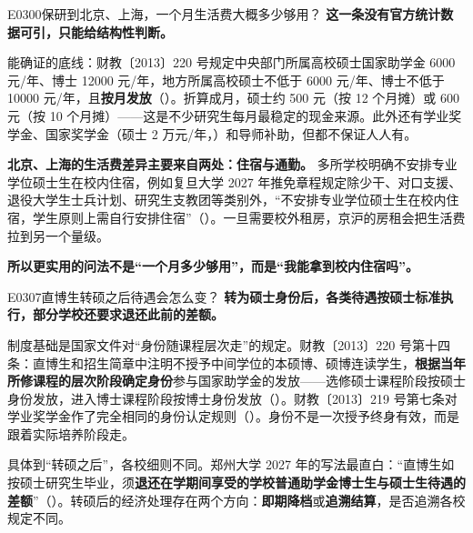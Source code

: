 \begin{qa}{E0300}{保研到北京、上海，一个月生活费大概多少够用？}
\textbf{这一条没有官方统计数据可引，只能给结构性判断。}

能确证的底线：财教〔2013〕220 号规定中央部门所属高校硕士国家助学金 6000 元/年、博士 12000 元/年，地方所属高校硕士不低于 6000 元/年、博士不低于 10000 元/年，且\textbf{按月发放}（）。折算成月，硕士约 500 元（按 12 个月摊）或 600 元（按 10 个月摊）——这是不少研究生每月最稳定的现金来源。此外还有学业奖学金、国家奖学金（硕士 2 万元/年，）和导师补助，但都不保证人人有。

\textbf{北京、上海的生活费差异主要来自两处：住宿与通勤。} 多所学校明确不安排专业学位硕士生在校内住宿，例如复旦大学 2027 年推免章程规定除少干、对口支援、退役大学生士兵计划、研究生支教团等类别外，“不安排专业学位硕士生在校内住宿，学生原则上需自行安排住宿”（）。一旦需要校外租房，京沪的房租会把生活费拉到另一个量级。

\textbf{所以更实用的问法不是“一个月多少够用”，而是“我能拿到校内住宿吗”。}
\end{qa}

\begin{qa}{E0307}{直博生转硕之后待遇会怎么变？}
\textbf{转为硕士身份后，各类待遇按硕士标准执行，部分学校还要求退还此前的差额。}

制度基础是国家文件对“身份随课程层次走”的规定。财教〔2013〕220 号第十四条：直博生和招生简章中注明不授予中间学位的本硕博、硕博连读学生，\textbf{根据当年所修课程的层次阶段确定身份}参与国家助学金的发放——选修硕士课程阶段按硕士身份发放，进入博士课程阶段按博士身份发放（）。财教〔2013〕219 号第七条对学业奖学金作了完全相同的身份认定规则（）。身份不是一次授予终身有效，而是跟着实际培养阶段走。

具体到“转硕之后”，各校细则不同。郑州大学 2027 年的写法最直白：“直博生如按硕士研究生毕业，须\textbf{退还在学期间享受的学校普通助学金博士生与硕士生待遇的差额}”（）。转硕后的经济处理存在两个方向：\textbf{即期降档}或\textbf{追溯结算}，是否追溯各校规定不同。
\end{qa}

